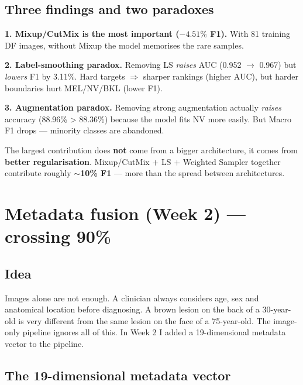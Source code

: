 \documentclass[11pt,a4paper]{article}
\begin{document}
\subsection{Three findings and two paradoxes}

\textbf{1. Mixup/CutMix is the most important ($-4.51\%$ F1).} With 81 training DF images, without Mixup the model memorises the rare samples.

\textbf{2. Label-smoothing paradox.} Removing LS \textit{raises} AUC (0.952 $\to$ 0.967) but \textit{lowers} F1 by 3.11\%. Hard targets $\Rightarrow$ sharper rankings (higher AUC), but harder boundaries hurt MEL/NV/BKL (lower F1).

\textbf{3. Augmentation paradox.} Removing strong augmentation actually \textit{raises} accuracy (88.96\% > 88.36\%) because the model fits NV more easily. But Macro F1 drops --- minority classes are abandoned.

\begin{idea}
The largest contribution does \textbf{not} come from a bigger architecture, it comes from \textbf{better regularisation}. Mixup/CutMix $+$ LS $+$ Weighted Sampler together contribute roughly \textbf{$\sim$10\% F1} --- more than the spread between architectures.
\end{idea}

\section{Metadata fusion (Week 2) --- crossing 90\%}

\subsection{Idea}

\begin{simple}
Images alone are not enough. A clinician always considers age, sex and anatomical location before diagnosing. A brown lesion on the back of a 30-year-old is very different from the same lesion on the face of a 75-year-old. The image-only pipeline ignores all of this. In Week 2 I added a 19-dimensional metadata vector to the pipeline.
\end{simple}

\subsection{The 19-dimensional metadata vector}
\end{document}
